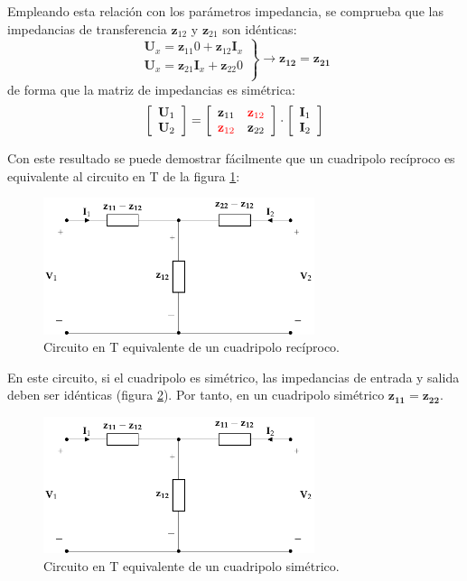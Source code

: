 Empleando esta relación con los parámetros impedancia, se comprueba que las impedancias de transferencia $\mathbf{z}_{12}$ y $\mathbf{z}_{21}$ son idénticas:
\[
  \left.
    \begin{array}{l}
      \mathbf{U}_x = \mathbf{z}_{11} 0  + \mathbf{z}_{12} \mathbf{I}_x\\
      \mathbf{U}_x = \mathbf{z}_{21} \mathbf{I}_x + \mathbf{z}_{22} 0\\
    \end{array} \right\} \rightarrow \mathbf{z_{12}} = \mathbf{z_{21}}
\]
de forma que la matriz de impedancias es simétrica:
\[
\left[
    \begin{array}{c}
      \mathbf{U}_1\\
      \mathbf{U}_2
    \end{array}
  \right] =
  \left[
    \begin{array}{cc}
      \mathbf{z}_{11} & \color{red}{\mathbf{z}_{12}}\\
      \color{red}{\mathbf{z}_{12}} & \mathbf{z}_{22}
    \end{array}
  \right] \cdot
  \left[
    \begin{array}{c}
      \mathbf{I}_1\\
      \mathbf{I}_2
    \end{array}
  \right]
\]

Con este resultado se puede demostrar fácilmente que un cuadripolo recíproco es equivalente al circuito en T de la figura \ref{fig:impedancia-equivalente-recíproco}:

\begin{figure}[H]
  \centering
  \includegraphics[height=4cm]{../figs/circuitoEquivalenteZReciproco.pdf}
  \caption{Circuito en T equivalente de un cuadripolo recíproco.}
  \label{fig:impedancia-equivalente-recíproco}
\end{figure}

En este circuito, si el cuadripolo es simétrico, las impedancias de entrada y salida deben ser idénticas (figura \ref{fig:impedancia-equivalente-simétrico}). Por tanto, en un cuadripolo simétrico $\mathbf{z_{11}} = \mathbf{z_{22}}$.
\begin{figure}[H]
  \centering
  \includegraphics[height=4cm]{../figs/circuitoEquivalenteZSimetrico.pdf}
  \caption{Circuito en T equivalente de un cuadripolo simétrico.}
  \label{fig:impedancia-equivalente-simétrico}
\end{figure}



